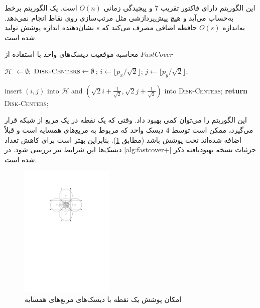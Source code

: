 \documentclass[12pt]{article}
\begin{document}
این الگوریتم دارای فاکتور تقریب 7 و پیچیدگی زمانی $O(n)$ است. یک الگوریتم برخط به‌حساب می‌آید و هیچ پیش‌پردازشی مثل مرتب‌سازی روی نقاط انجام نمی‌دهد. به‌اندازه $O(s)$ حافظه اضافی مصرف می‌کند که $s$ نشان‌دهنده اندازه پوشش تولید شده است.

\begin{algorithm}[H]
\singlespacing
\caption{
محاسبه موقعیت دیسک‌های واحد با استفاده از $FastCover$
} 
\label{alg:fastcover} 
\begin{latin}
\begin{algorithmic}[1] 
\STATE \texttt{$\mathcal{H}$} $\leftarrow \emptyset$; $\textsc{Disk-Centers} \leftarrow \emptyset$;
\STATE  $i\leftarrow \lfloor p_x/\sqrt{2}\rfloor$;   $j\leftarrow \lfloor p_y/\sqrt{2}\rfloor$;

\STATE insert $(i,j)$ into $\mathcal{H}$ and  $(\sqrt{2}i + \frac{1}{\sqrt{2}}, \sqrt{2}j + \frac{1}{\sqrt{2}})$ into \textsc{Disk-Centers};
\ENDIF
\ENDFOR
\STATE \textbf{return} \textsc{Disk-Centers};
\end{algorithmic}
\end{latin}
\end{algorithm}


این الگوریتم را می‌توان کمی بهبود داد. وقتی که یک نقطه در یک مربع از شبکه قرار می‌گیرد، ممکن است توسط 4 دیسک واحد که مربوط به مربع‌های همسایه است و قبلاً اضافه شده‌اند تحت پوشش باشد (مطابق \cref{fig:f3}). بنابراین بهتر است برای کاهش تعداد دیسک‌ها این شرایط نیز بررسی شود. در
\cref{alg:fastcover+}
جزئیات نسخه بهبودیافته ذکر شده است.

\begin{figure}[H]
\centering
\includegraphics[width=0.4\textwidth]{figs/f3}
\caption{
امکان پوشش یک نقطه با دیسک‌های مربع‌های همسایه
}
\label{fig:f3}
\end{figure}
\end{document}
